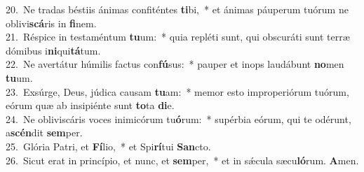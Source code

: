{20.~}Ne tradas béstiis ánimas confiténtes \textbf{ti}bi,~* et ánimas páuperum tuórum ne oblivi\textbf{scá}ris in \textbf{fi}nem.\\
{21.~}Réspice in testaméntum \textbf{tu}um:~* quia repléti sunt, qui obscuráti sunt terræ dómibus i\textbf{ni}qui\textbf{tá}tum.\\
{22.~}Ne avertátur húmilis factus con\textbf{fú}sus:~* pauper et inops laudábunt \textbf{no}men \textbf{tu}um.\\
{23.~}Exsúrge, Deus, júdica causam \textbf{tu}am:~* memor esto improperiórum tuórum, eórum quæ ab insipiénte sunt \textbf{to}ta \textbf{di}e.\\
{24.~}Ne obliviscáris voces inimicórum tu\textbf{ó}rum:~* supérbia eórum, qui te odérunt, a\textbf{scén}dit \textbf{sem}per.\\
{25.~}Glória Patri, et \textbf{Fí}lio,~* et Spi\textbf{rí}tui \textbf{San}cto.\\
{26.~}Sicut erat in princípio, et nunc, et \textbf{sem}per,~* et in sǽcula sæcu\textbf{ló}rum. \textbf{A}men.\\

